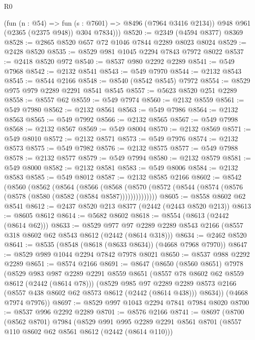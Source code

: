 \begin{lexlean}{R0}
\begin{coremodule}
          (fun (n : @54) => fun (s : @7601) => @8496 (@7964 @3416 @2134))
          @948
          @961
          (@2365 (@2375 @948))
          @304
          @7834)))
@8520 := @2349 (@4594 @8377) @8369
@8528 := @2865 @8520 @657 @72 @1046 @7844 @2289 @8023 @8024
@8529 := @2428 @8520
@8535 := @8529 @981 @1045 @2294 @7843 @7972 @8022
@8537 := @2418 @8520 @972
@8540 := @8537 @980 @2292 @2289
@8541 := @549 @7968
@8542 := @2132 @8541
@8543 := @549 @7970
@8544 := @2132 @8543
@8545 := @8544 @2166
@8548 := @8540 (@8542 @8545) @7972
@8554 := @8529 @975 @979 @2289 @2291 @8541 @8545
@8557 := @5623 @8520 @251 @2289
@8558 := @8557 @62
@8559 := @549 @7974
@8560 := @2132 @8559
@8561 := @549 @7980
@8562 := @2132 @8561
@8563 := @549 @7986
@8564 := @2132 @8563
@8565 := @549 @7992
@8566 := @2132 @8565
@8567 := @549 @7998
@8568 := @2132 @8567
@8569 := @549 @8004
@8570 := @2132 @8569
@8571 := @549 @8010
@8572 := @2132 @8571
@8573 := @549 @7976
@8574 := @2132 @8573
@8575 := @549 @7982
@8576 := @2132 @8575
@8577 := @549 @7988
@8578 := @2132 @8577
@8579 := @549 @7994
@8580 := @2132 @8579
@8581 := @549 @8000
@8582 := @2132 @8581
@8583 := @549 @8006
@8584 := @2132 @8583
@8585 := @549 @8012
@8587 := @2132 @8585 @2166
@8602 := @8542
    (@8560
      (@8562
        (@8564
          (@8566
            (@8568
              (@8570 (@8572 (@8544 (@8574 (@8576 (@8578 (@8580 (@8582 (@8584 @8587))))))))))))))
@8605 := @8558 @8602 @62 @8541
@8612 := @2437 @8520 @213 @8377 (@2442 (@2443 @8520 @213))
@8613 := @8605 @8612
@8614 := @5682 @8602
@8618 := @8554 (@8613 (@2442 (@8614 @62)))
@8633 := @8529
    @977
    @97
    @2289
    @2289
    @8543
    @2166
    (@8557 @318 @8602 @62 @8543 @8612 (@2442 (@8614 @318)))
@8634 := @2462 @8520
@8641 := @8535 (@8548 (@8618 (@8633 @8634)) (@4668 @7968 @7970))
@8647 := @8529 @989 @1044 @2294 @7842 @7978 @8021
@8650 := @8537 @988 @2292 @2289
@8651 := @8574 @2166
@8691 := @8647
    (@8650
      (@8560 @8651)
      @7978
      (@8529
        @983
        @987
        @2289
        @2291
        @8559
        @8651
        (@8557 @78 @8602 @62 @8559 @8612 (@2442 (@8614 @78)))
        (@8529
          @985
          @97
          @2289
          @2289
          @8573
          @2166
          (@8557 @438 @8602 @62 @8573 @8612 (@2442 (@8614 @438)))
          @8634))
      (@4668 @7974 @7976))
@8697 := @8529 @997 @1043 @2294 @7841 @7984 @8020
@8700 := @8537 @996 @2292 @2289
@8701 := @8576 @2166
@8741 := @8697
    (@8700
      (@8562 @8701)
      @7984
      (@8529
        @991
        @995
        @2289
        @2291
        @8561
        @8701
        (@8557 @110 @8602 @62 @8561 @8612 (@2442 (@8614 @110)))

\end{coremodule}
\end{lexlean}
